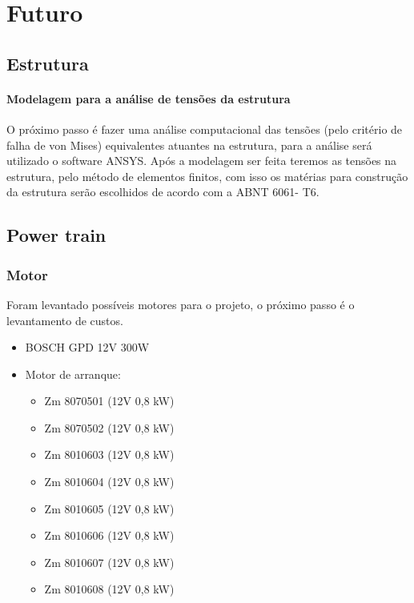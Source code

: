 \chapter[Futuro]{Futuro}

\section{Estrutura}

\subsubsection{Modelagem para a análise de tensões da estrutura}

O próximo passo é fazer uma análise computacional das tensões (pelo critério de falha de von Mises) equivalentes atuantes na estrutura, para a análise  será utilizado o software ANSYS. Após a modelagem ser feita teremos as tensões na estrutura, pelo método de elementos finitos, com isso os matérias para construção da estrutura serão escolhidos de acordo com a  ABNT 6061- T6.

\section{Power train}

\subsection{Motor}

Foram levantado possíveis motores para o projeto, o próximo passo é o levantamento de custos.

\begin{itemize}
 \item BOSCH GPD 12V 300W
 \item Motor de arranque:
  \begin{itemize}
    \item Zm 8070501 (12V 0,8 kW)
    \item Zm 8070502 (12V 0,8 kW)
    \item Zm 8010603 (12V 0,8 kW)
    \item Zm 8010604 (12V 0,8 kW)
    \item Zm 8010605 (12V 0,8 kW)
    \item Zm 8010606 (12V 0,8 kW)
    \item Zm 8010607 (12V 0,8 kW)
    \item Zm 8010608 (12V 0,8 kW)
  \end{itemize}
\end{itemize}

